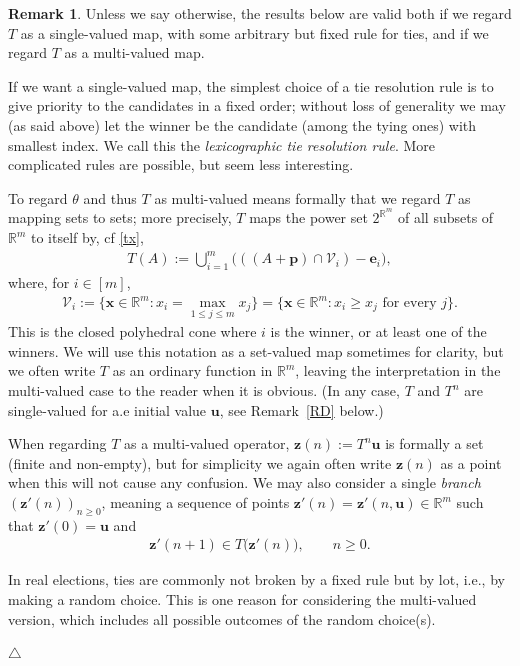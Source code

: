 \documentclass[11pt,reqno,tbtags,a4paper]{amsart}
\numberwithin{equation}{section}
\renewcommand\le{\leq}
\renewcommand\ge{\geq}
\renewcommand\leq{\leqslant}
\renewcommand\geq{\geqslant}
\theoremstyle{plain}%
\theoremstyle{definition}
\newcommand\xqed[1]{%
    \leavevmode\unskip\penalty9999 \hbox{}\nobreak\hfill
    \quad\hbox{#1}}
\newtheorem{remarkqqq}[theorem]{Remark}
\newenvironment{remark}{\begin{remarkqqq}}
  {\xqed{$\triangle$}\end{remarkqqq}}
\theoremstyle{remark}
\newcommand{\refR}[1]{Remark~\ref{#1}}
\newcommand\bigset[1]{\ensuremath{\bigl\{#1\bigr\}}}
\newcommand\bigpar[1]{\bigl(#1\bigr)}
\newcommand\punkt{\xperiod}    %
\newcommand\cf{cf\punkt}
\newcommand{\aex}{a.e\punkt}
\newcommand\bbR{\mathbb R}
\newcommand\cV{\mathcal V}
\newcommand\ve{\mathbf{e}}
\newcommand\vp{\mathbf{p}}
\newcommand\vu{\mathbf{u}}
\newcommand\vx{\mathbf{x}}
\newcommand\vz{\mathbf{z}}
\newcommand\0{{\boldsymbol 0}}
\newcommand\1{{\boldsymbol 1}}
\begin{document}
\begin{remark}\label{Rmulti}
Unless we say otherwise, the results below are valid both if we regard $T$
as a single-valued map, with some arbitrary but fixed rule for ties, and 
if we regard $T$ as a multi-valued map.

If we want a single-valued map, the simplest choice
of a tie resolution rule
is to give priority to 
the candidates in a fixed order;
without loss of generality we may (as said above)
let the winner be the candidate (among the tying ones) with smallest index.
We call this the \emph{lexicographic tie resolution rule}.
More complicated rules are possible, but seem less interesting.

To regard $\theta$ and thus $T$ as multi-valued means formally that
we regard $T$ as mapping sets to sets; more precisely, $T$ maps the power set
$2^{\bbR^m}$ of all subsets of $\bbR^m$ to itself by, \cf{} \eqref{tx},
\begin{align}\label{txa}
  T(A) := \bigcup_{i=1}^m \bigpar{((A+\vp)\cap \cV_i) - \ve_i},
\end{align}
where, for $i\in[m]$,
\begin{align}
\cV_i:=\bigset{\vx\in\bbR^m: x_i=\max_{1\le j\le m}x_j}
=\bigset{\vx\in\bbR^m: x_i\ge x_j\text{ for every }j}.
\end{align}
This is the closed polyhedral cone where $i$ is the winner, or at
least one of the winners.
We will use this notation as a set-valued map sometimes for clarity, but we
often write $T$ as an ordinary function in $\bbR^m$, leaving 
the  interpretation in the multi-valued case to the reader when it is obvious.
(In any case, $T$ and $T^n$ are single-valued for \aex{} initial value
$\vu$, see \refR{RD} below.)

When regarding $T$ as a multi-valued operator, $\vz(n):=T^n\vu$ is formally
a set (finite and non-empty), but for simplicity we again often write
$\vz(n)$ as a point when this will not cause any confusion.
We may also consider a single \emph{branch}
$(\vz'(n))_{n\ge0}$, meaning a sequence of points 
$\vz'(n)=\vz'(n,\vu)\in\bbR^m$
such that $\vz'(0)=\vu$ and 
\begin{align}\label{branch}
%
\vz'(n+1)\in T\bigl(\vz'(n)\bigr),
\qquad n\ge0.
\end{align}

In real elections, ties are commonly not broken by a fixed rule but by lot,
i.e., by making a random choice. This is one reason for considering the
multi-valued version, which includes all possible outcomes of the random
choice(s).


\end{remark}
\end{document}
